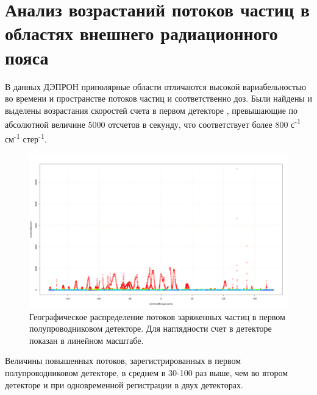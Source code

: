 \section{Анализ возрастаний потоков частиц в областях внешнего радиационного пояса}\label{sec:flash_analisys}
В  данных  ДЭПРОН приполярные области отличаются высокой вариабельностью во времени и пространстве потоков частиц и соответственно доз. Были найдены и выделены возрастания скоростей счета в первом детекторе	\label{fig:depronlatmap148}, превышающие по абсолютной величине 5000 отсчетов в секунду, что соответствует более 800 с\textsuperscript{-1} см\textsuperscript{-1} стер\textsuperscript{-1}. 
\begin{figure}[h]
	\centering
	\includegraphics[width=0.8\linewidth]{images/Flash/depron_lat_map_148}
	\caption{Географическое распределение потоков заряженных частиц в первом полупроводниковом детекторе. Для наглядности счет в детекторе показан в линейном масштабе.}
	\label{fig:depronlatmap148}
\end{figure}
Величины повышенных потоков, зарегистрированных в первом полупроводниковом детекторе, в среднем в 30-100 раз выше, чем во втором детекторе и при одновременной регистрации в двух детекторах.
